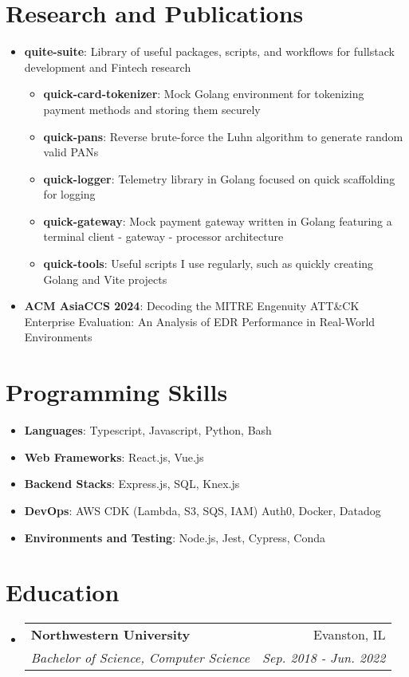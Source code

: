 \documentclass[letterpaper,11pt]{article}
\makeatletter
\newcommand{\resumeItem}[2]{
  \item\small{
    \textbf{#1}{: #2 \vspace{-2pt}}
  }
}
\newcommand{\resumeSubheading}[4]{
  \vspace{-1pt}\item
    \begin{tabular*}{0.97\textwidth}{l@{\extracolsep{\fill}}r}
      \textbf{#1} & #2 \\
      \textit{\small#3} & \textit{\small #4} \\
    \end{tabular*}\vspace{-5pt}
}
\newcommand{\resumeSubItem}[2]{\resumeItem{#1}{#2}\vspace{-1pt}}
\newcommand{\resumeSubHeadingListStart}{\begin{itemize}[leftmargin=*]}
\newcommand{\resumeSubHeadingListEnd}{\end{itemize}}
\makeatother
\begin{document}
\section{Research and Publications}
  \resumeSubHeadingListStart
  \resumeSubItem{quite-suite}{Library of useful packages, scripts, and workflows for fullstack development and Fintech research}
  \resumeSubHeadingListStart
  \resumeSubItem{quick-card-tokenizer}{Mock Golang environment for tokenizing payment methods and storing them securely}
  \resumeSubItem{quick-pans}{Reverse brute-force the Luhn algorithm to generate random valid PANs}
  \resumeSubItem{quick-logger}{Telemetry library in Golang focused on quick scaffolding for logging}
  \resumeSubItem{quick-gateway}{Mock payment gateway written in Golang featuring a terminal client - gateway - processor architecture}
  \resumeSubItem{quick-tools}{Useful scripts I use regularly, such as quickly creating Golang and Vite projects}
  \resumeSubHeadingListEnd
    \resumeSubItem{ACM AsiaCCS 2024}{Decoding the MITRE Engenuity ATT\&CK Enterprise Evaluation: An Analysis of EDR Performance in Real-World Environments}
  \resumeSubHeadingListEnd

\section{Programming Skills}
 \resumeSubHeadingListStart
    \item{
        \textbf{Languages}{: Typescript, Javascript, Python, Bash}
        \vspace{-2pt}
    }
    \item{
        \textbf{Web Frameworks}{: React.js, Vue.js}
        \vspace{-2pt}
    }
    \item{
        \textbf{Backend Stacks}{: Express.js, SQL, Knex.js}
        \vspace{-2pt}
    }
    \item{
        \textbf{DevOps}{: AWS CDK (Lambda, S3, SQS, IAM) Auth0, Docker, Datadog}
        \vspace{-2pt}
     }
    \item{
        \textbf{Environments and Testing}{: Node.js, Jest, Cypress, Conda}
        \vspace{-2pt}
    }
 \resumeSubHeadingListEnd

 \section{Education}
  \resumeSubHeadingListStart
    \resumeSubheading
      {Northwestern University}{Evanston, IL}
      {Bachelor of Science, Computer Science }{Sep. 2018 - Jun. 2022}
  \resumeSubHeadingListEnd
\end{document}
